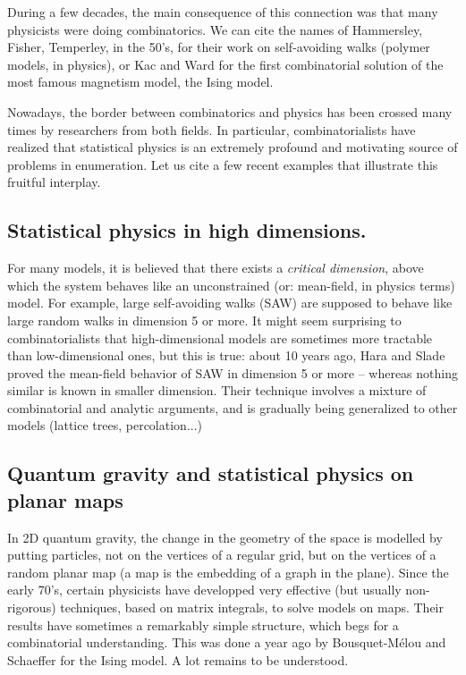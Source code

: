 \documentclass{amsart}
\begin{document}
During a few decades, the main consequence of this connection was
that many physicists were doing combinatorics. We can cite the names of
Hammersley, Fisher, Temperley, in the 50's, for their work on
self-avoiding walks (polymer models, in physics), or Kac and Ward for the first
combinatorial solution of the most famous magnetism model, the Ising
model. 

Nowadays, the border between combinatorics and physics has been
crossed many times by researchers from both fields. In particular,
combinatorialists have realized that statistical physics is an
extremely profound and motivating source of problems in
enumeration. Let us cite a few recent examples that illustrate this
fruitful interplay.

\subsection{Statistical physics in high dimensions.} For many models,
it is believed that there exists a {\em critical dimension\/}, above
which the system behaves like an unconstrained (or: mean-field, in
physics terms) model. For example, large self-avoiding walks (SAW) are
supposed to behave like large random walks in dimension 5 or more. It
might seem surprising to combinatorialists that high-dimensional models
are sometimes more tractable than low-dimensional ones, but this is
true: about 10 years ago, Hara and Slade proved the mean-field
behavior of SAW in dimension 5 or more -- whereas nothing similar
is known in smaller dimension. Their technique involves a mixture of
combinatorial and analytic arguments, and is gradually being
generalized to other models (lattice trees, percolation...)

\subsection{Quantum gravity and statistical physics on planar maps}
In 2D quantum gravity, the change in the geometry of the space is
modelled by putting particles, not on the vertices of a regular grid,
but on the vertices of a random planar map (a map is the embedding of
a graph in the plane). Since the early 70's, certain physicists have
developped very effective (but usually non-rigorous) techniques,
based on matrix integrals, to solve models on maps. Their results have
sometimes a remarkably simple structure, which begs for a combinatorial
understanding. This was done a year ago by Bousquet-M\'elou and
Schaeffer for the Ising model. A lot remains to be understood.
\end{document}
